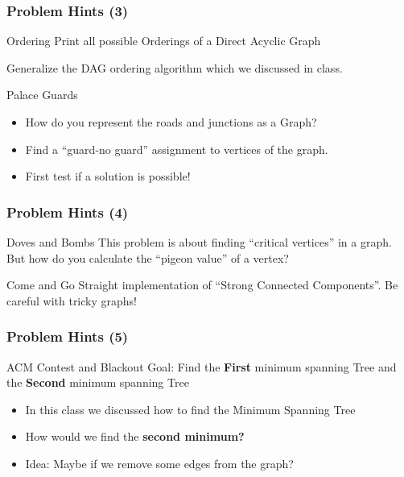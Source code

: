 \begin{frame}
  \frametitle{Problem Hints (3)}
  {\smaller
    \begin{block}{Ordering}
      Print all possible Orderings of a Direct Acyclic Graph

      \bigskip

      Generalize the DAG ordering algorithm which we discussed in class.
    \end{block}
    
    \begin{block}{Palace Guards}
      \begin{itemize}
        \item How do you represent the roads and junctions as a Graph?
        \item Find a ``guard-no guard'' assignment to vertices of the
          graph.
        \item First test if a solution is possible!
      \end{itemize}
    \end{block}    
  }
\end{frame}

\begin{frame}
  \frametitle{Problem Hints (4)}
  {\smaller
    \begin{block}{Doves and Bombs}
      This problem is about finding ``critical vertices'' in a
      graph. But how do you calculate the ``pigeon value'' of a
      vertex?
    \end{block}

    \begin{block}{Come and Go}
      Straight implementation of ``Strong Connected Components''. Be
      careful with tricky graphs!
    \end{block}    
  }
\end{frame}

\begin{frame}
  \frametitle{Problem Hints (5)}
  {\smaller
    \begin{block}{ACM Contest and Blackout}
      Goal: Find the {\bf First} minimum spanning Tree and the {\bf
        Second} minimum spanning Tree
    \end{block}

    \bigskip
    
    \begin{itemize}
    \item In this class we discussed how to find the Minimum Spanning Tree      
    \item How would we find the {\bf second minimum?}
    \item Idea: Maybe if we remove some edges from the graph?
    \end{itemize}
  }
\end{frame}

